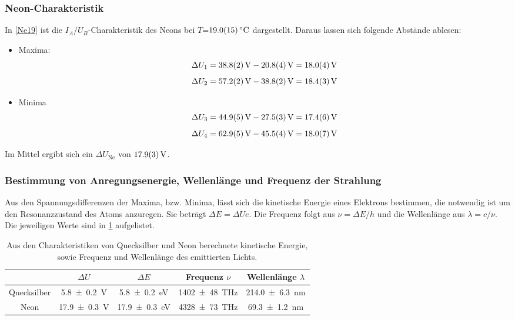 \documentclass[
	a4paper,
	12pt,
	pagesize,
	ngerman
]{scrartcl}
\begin{document}
	\subsubsection{Neon-Charakteristik}
	In \cref{Ne19} ist die $I_A/U_B$-Charakteristik des Neons bei $T$=$\SI{19 +- 1,5}{\degreeCelsius}$ dargestellt. Daraus lassen sich folgende Abstände ablesen:
	\begin{itemize}
		\item Maxima:
		\begin{equation*}
		\Delta{U}_1 = \SI{38,8 +- 0,2}{V} -\SI{20,8 +- 0,4}{V} = \SI{18,0+- 0,4}{V}
		\end{equation*}
		\begin{equation*}
		\Delta{U}_2 = \SI{57,2 +- 0,2}{V} - \SI{38,8 +- 0,2}{V} = \SI{18,4 +- 0,3}{V}
		\end{equation*}
		\item Minima
		\begin{equation*}\Delta{U}_3 = \SI{44,9 +- 0,5}{V} -\SI{27,5 +- 0,3}{V} = \SI{17,4 +- 0,6}{V}\end{equation*}
		\begin{equation*}\Delta{U}_4 = \SI{62,9 +- 0,5}{V}- \SI{45,5 +- 0,4}{V} = \SI{18,0 +- 0,7}{V}\end{equation*}
	\end{itemize}
	Im Mittel ergibt sich ein $\Delta{U_\text{Ne}}$ von $\SI{17,9 +- 0,3}{V}$.

	\subsubsection{Bestimmung von Anregungsenergie, Wellenlänge und Frequenz der Strahlung}
	Aus den Spannungsdifferenzen der Maxima, bzw. Minima, lässt sich die kinetische Energie eines Elektrons bestimmen, die notwendig ist um den Resonanzzustand des Atoms anzuregen.
	Sie beträgt $\Delta{E}=\Delta{U}e$.
	Die Frequenz folgt aus $\nu=\Delta{E}/h$ und die Wellenlänge aus $\lambda=c/\nu$.\cite{NIST}
	Die jeweiligen Werte sind in \cref{TabelleEnergie} aufgelistet.
	\begin{table}[H]
		\centering
		\begin{tabular}{ c | c | c | c | c }
			&$\Delta{U}$ & $\Delta{E}$ &  Frequenz $\nu$ & Wellenlänge $\lambda$ \\ \hline
			Quecksilber&\SI{5,8 +- 0,2}{V} &\SI{5,8 +- 0,2}{eV} & \SI{1402 +- 48}{THz} & \SI{214,0 +- 6,3}{nm} \\
			Neon&\SI{17,9+- 0,3}{V} & \SI{17,9+- 0,3}{eV} & \SI{4328 +- 73}{THz} & \SI{69,3 +- 1,2}{nm} \\
		\end{tabular}
		\caption{Aus den Charakteristiken von Quecksilber und Neon berechnete kinetische Energie, sowie  Frequenz und Wellenlänge des emittierten Lichts.}
		\label{TabelleEnergie} 
	\end{table}
	
\end{document}
